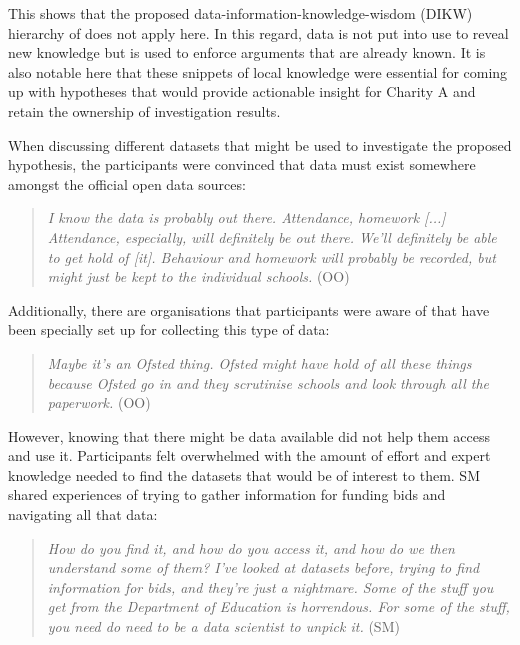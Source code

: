 This shows that the proposed data-information-knowledge-wisdom (DIKW) hierarchy of \citet{ackoff_data_1999} does not apply here. In this regard, data is not put into use to reveal new knowledge but is used to enforce arguments that are already known. It is also notable here that these snippets of local knowledge were essential for coming up with hypotheses that would provide actionable insight for Charity A and retain the ownership of investigation results.

When discussing different datasets that might be used to investigate the proposed hypothesis, the participants were convinced that data must exist somewhere amongst the official open data sources:
\begin{quote}
    \textit{I know the data is probably out there. Attendance, homework [...] Attendance, especially, will definitely be out there. We'll definitely be able to get hold of [it]. Behaviour and homework will probably be recorded, but might just be kept to the individual schools.} (OO)
\end{quote}
Additionally, there are organisations that participants were aware of that have been specially set up for collecting this type of data:
\begin{quote}
    \textit{Maybe it's an Ofsted thing. Ofsted might have hold of all these things because Ofsted go in and they scrutinise schools and look through all the paperwork.} (OO)
\end{quote}
However, knowing that there might be data available did not help them access and use it. Participants felt overwhelmed with the amount of effort and expert knowledge needed to find the datasets that would be of interest to them. SM shared experiences of trying to gather information for funding bids and navigating all that data: 
\begin{quote}
    \textit{How do you find it, and how do you access it, and how do we then understand some of them? I've looked at datasets before, trying to find information for bids, and they're just a nightmare. Some of the stuff you get from the Department of Education is horrendous. For some of the stuff, you need do need to be a data scientist to unpick it.} (SM)
\end{quote}

